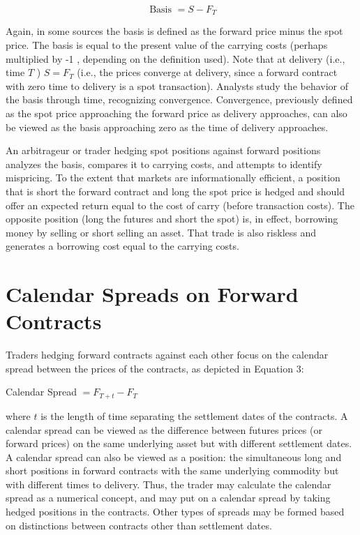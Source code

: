 \documentclass[11pt]{article}
\begin{document}
\begin{equation*}
\text { Basis }=S-F_{T} \tag{2}
\end{equation*}


Again, in some sources the basis is defined as the forward price minus the spot price. The basis is equal to the present value of the carrying costs (perhaps multiplied by -1 , depending on the definition used). Note that at delivery (i.e., time $T$ ) $S=F_{T}$ (i.e., the prices converge at delivery, since a forward contract with zero time to delivery is a spot transaction). Analysts study the behavior of the basis through time, recognizing convergence. Convergence, previously defined as the spot price approaching the forward price as delivery approaches, can also be viewed as the basis approaching zero as the time of delivery approaches.

An arbitrageur or trader hedging spot positions against forward positions analyzes the basis, compares it to carrying costs, and attempts to identify mispricing. To the extent that markets are informationally efficient, a position that is short the forward contract and long the spot price is hedged and should offer an expected return equal to the cost of carry (before transaction costs). The opposite position (long the futures and short the spot) is, in effect, borrowing money by selling or short selling an asset. That trade is also riskless and generates a borrowing cost equal to the carrying costs.

\section*{Calendar Spreads on Forward Contracts}
Traders hedging forward contracts against each other focus on the calendar spread between the prices of the contracts, as depicted in Equation 3:

Calendar Spread $=F_{T+t}-F_{T}$

where $t$ is the length of time separating the settlement dates of the contracts. A calendar spread can be viewed as the difference between futures prices (or forward prices) on the same underlying asset but with different settlement dates. A calendar spread can also be viewed as a position: the simultaneous long and short positions in forward contracts with the same underlying commodity but with different times to delivery. Thus, the trader may calculate the calendar spread as a numerical concept, and may put on a calendar spread by taking hedged positions in the contracts. Other types of spreads may be formed based on distinctions between contracts other than settlement dates.
\end{document}
